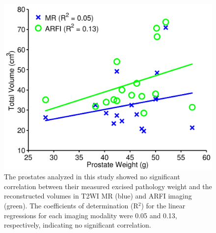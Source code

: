\begin{figure}[htb!]
\centering
\includegraphics[width=0.5\linewidth]{figs/corr_weight_vol.pdf}
\caption{The prostates analyzed in this study showed no significant correlation
    between their measured excised pathology weight and the reconstructed
    volumes in T2WI MR (blue) and ARFI imaging (green).  The coefficients of
    determination (R$^2$) for the linear regressions for each imaging modality were
    0.05 and 0.13, respectively, indicating no significant correlation.}
\label{fig:mr_arfi_weight} 
\end{figure}
